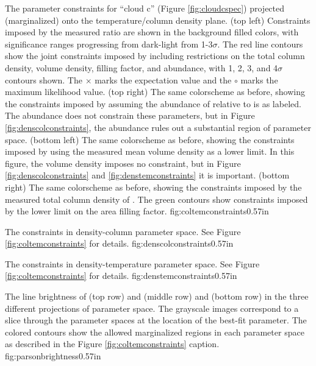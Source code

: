 {The parameter constraints for ``cloud c'' (Figure \ref{fig:cloudcspec})
projected (marginalized) onto the temperature/column density plane.\newline
(top left) Constraints imposed by the measured ratio \Rone are shown in the
background filled colors,
with significance ranges progressing from dark-light from 1-3$\sigma$.  The
red line contours show the joint constraints imposed by including
restrictions on the
total column density, volume density,  filling factor, and abundance, with
1, 2, 3, and 4$\sigma$ contours shown.
The $\times$ marks the expectation value and the $\circ$ marks the maximum
likelihood value.
\newline
(top right) The same colorscheme as before, showing the constraints imposed by
assuming the abundance of \para relative to \hh is as labeled.  
The abundance does not constrain these parameters, but in Figure
\ref{fig:denscolconstraints}, the abundance rules out a substantial region of parameter
space.
\newline
(bottom left) The same colorscheme as before, showing the constraints imposed
by using the measured mean volume density as a lower limit.  In this figure,
the volume density imposes no constraint, but in Figure \ref{fig:denscolconstraints}
and \ref{fig:denstemconstraints} it is important.
\newline
(bottom right) The same colorscheme as before, showing the constraints imposed
by the measured total column density of \hh.  The green contours show
constraints imposed by the lower limit on the area filling factor.}
{fig:coltemconstraints}{0.5}{7in}

{The constraints in density-column parameter space.
See Figure \ref{fig:coltemconstraints} for details.}
{fig:denscolconstraints}{0.5}{7in}

{The constraints in density-temperature parameter space.
See Figure \ref{fig:coltemconstraints} for details.}
{fig:denstemconstraints}{0.5}{7in}

{The line brightness of \para \threeohthree (top row) and \para \threetwoone
(middle row) and \Rone (bottom row) in the three different projections of parameter space.  The
grayscale images correspond to a slice through the parameter spaces at the
location of the best-fit parameter.  The colored contours show the allowed
marginalized regions in each parameter space as described in the
Figure \ref{fig:coltemconstraints} caption.}
{fig:parsonbrightness}{0.5}{7in}

